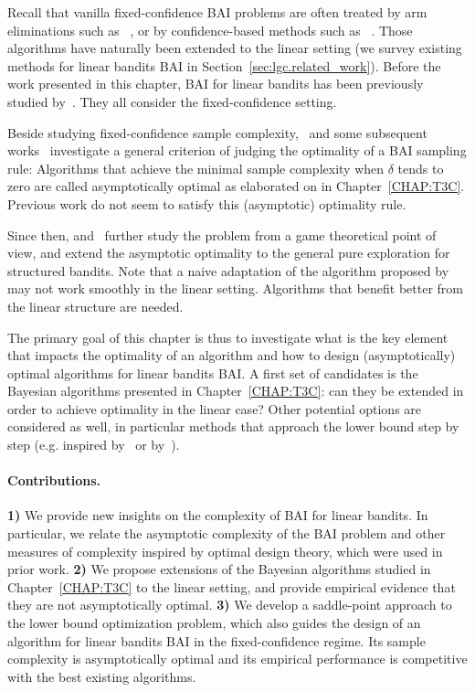 Recall that vanilla fixed-confidence BAI problems are often treated by arm eliminations such as \SE~\citep{karnin2013sha}, or by confidence-based methods such as \UGapE~\citep{gabillon2012ugape}. Those algorithms have naturally been extended to the linear setting (we survey existing methods for linear bandits BAI in Section~\ref{sec:lgc.related_work}). Before the work presented in this chapter, BAI for linear bandits has been previously studied by~\cite{soare2014linear,tao2018alba,xu2018linear,zaki2019maxoverlap,fiez2019transductive,kazerouni2019glb}. They all consider the fixed-confidence setting.

Beside studying fixed-confidence sample complexity,~\citet{garivier2016tracknstop} and some subsequent works~\citep{qin2017ttei,shang2020t3c} investigate a general criterion of judging the optimality of a BAI sampling rule: Algorithms that achieve the minimal sample complexity when $\delta$ tends to zero are called asymptotically optimal as elaborated on in Chapter~\ref{CHAP:T3C}. Previous work do not seem to satisfy this (asymptotic) optimality rule.

Since then, \citet{menard2019lma} and~\citet{degenne2019game} further study the problem from a game theoretical point of view, and extend the asymptotic optimality to the general pure exploration for structured bandits. Note that a naive adaptation of the algorithm proposed by~\cite{degenne2019game} may not work smoothly in the linear setting. Algorithms that benefit better from the linear structure are needed.

The primary goal of this chapter is thus to investigate what is the key element that impacts the optimality of an algorithm and how to design (asymptotically) optimal algorithms for linear bandits BAI. A first set of candidates is the Bayesian algorithms presented in Chapter~\ref{CHAP:T3C}: can they be extended in order to achieve optimality in the linear case? Other potential options are considered as well, in particular methods that approach the lower bound step by step (e.g. inspired by~\citealt{garivier2016tracknstop} or by~\cite{degenne2019game}).

\paragraph{Contributions.}
\textbf{1)}
We provide new insights on the complexity of BAI for linear bandits. In particular, we relate the asymptotic complexity of the BAI problem and other measures of complexity inspired by optimal design theory, which were used in prior work.
\textbf{2)}
We propose extensions of the Bayesian algorithms studied in Chapter~\ref{CHAP:T3C} to the linear setting, and provide empirical evidence that they are not asymptotically optimal.
\textbf{3)}
We develop a saddle-point approach to the lower bound optimization problem, which also guides the design of an algorithm \LG{} for linear bandits BAI in the fixed-confidence regime. Its sample complexity is asymptotically optimal and its empirical performance is competitive with the best existing algorithms.

%
%
%
